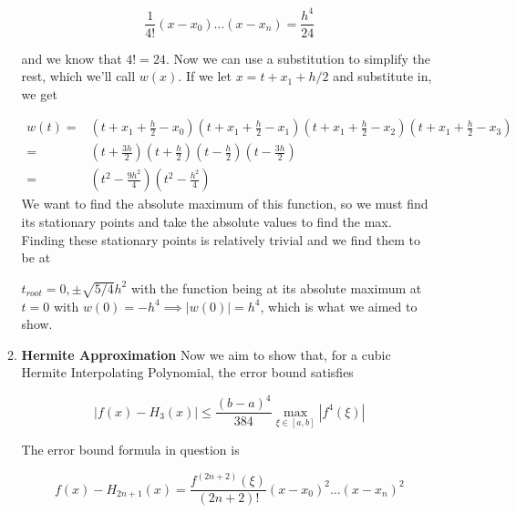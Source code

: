 \documentclass[12pt]{article}
\begin{document}
\begin{enumerate}
\begin{enumerate}
            \begin{equation*}
                \frac{1}{4!}(x-x_0)\dots(x-x_n) = \frac{h^4}{24}
            \end{equation*}

            and we know that $4! = 24$. Now we can use a substitution to simplify the rest, which we'll call $w(x)$. 
            If we let $x = t+x_1+h/2$ and substitute in, we get 

            \begin{equation*}
                \begin{split}
                    w(t) = &(t+x_1+\frac{h}{2}-x_0)(t+x_1+\frac{h}{2}-x_1)(t+x_1+\frac{h}{2}-x_2)(t+x_1+\frac{h}{2}-x_3) \\
                    = &(t+\frac{3h}{2})(t+\frac{h}{2})(t-\frac{h}{2})(t-\frac{3h}{2}) \\
                    = &(t^2-\frac{9h^2}{4})(t^2-\frac{h^2}{4})
                \end{split}
            \end{equation*}
            We want to find the absolute maximum of this function, so we must find its stationary points and 
            take the absolute values to find the max. Finding these stationary points is relatively trivial and we 
            find them to be at 
            
            $t_{root} = 0, \pm \sqrt{5/4}h^2$ with the function being at its absolute maximum at $t=0$ with 
            $w(0) = -h^4 \implies |w(0)| = h^4$, which is what we aimed to show.

            \item \textbf{Hermite Approximation} \newline
            Now we aim to show that, for a cubic Hermite Interpolating Polynomial, the error bound satisfies 

            \begin{equation}
                |f(x)-H_3(x)| \leq \frac{(b-a)^4}{384} \max_{\xi \in [a, b]} |f^4(\xi)|
                \label{eqn:To Solve 2b}
            \end{equation}

            The error bound formula in question is

            \begin{equation}
                f(x)-H_{2n+1}(x) = \frac{f^{(2n+2)}(\xi)}{(2n+2)!}(x-x_0)^2\dots(x-x_n)^2
                \label{eqn:Hermite Approximation Error}
            \end{equation}


\end{enumerate}
\end{enumerate}
\end{document}
